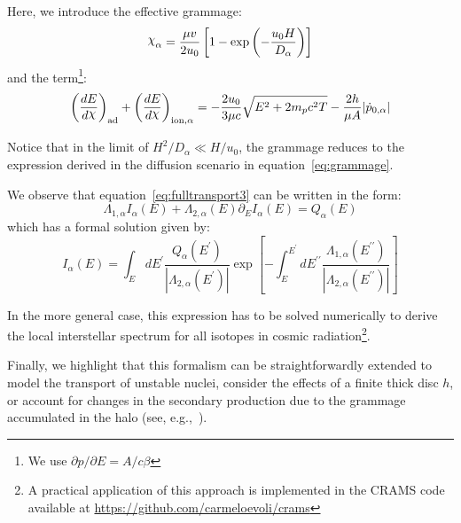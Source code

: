 Here, we introduce the effective grammage:
%
\begin{equation}
\rchi_\alpha = \frac{\mu v}{2 u_0} \left[ 1 - \exp \left(-\frac{u_0 H}{D_\alpha} \right) \right]
\end{equation}
%
and the term\footnote{We use $\partial p/\partial E = A / c \beta$}:
%
\begin{equation}
 \left( \frac{dE}{d\rchi}\right)_{\rm ad} + \left( \frac{dE}{d\rchi} \right)_{\rm ion, \alpha} = 
 -\frac{2 u_0}{3 \mu c} \sqrt{E^2 + 2 m_p c^2 T} - \frac{2 h}{\mu A} |\dot p_{0,\alpha}|
\end{equation}

Notice that in the limit of $H^2 / D_\alpha \ll H / u_0$, the grammage reduces to the expression derived in the diffusion scenario in equation~\ref{eq:grammage}.

We observe that equation~\ref{eq:fulltransport3} can be written in the form:
%
\begin{equation}
\Lambda_{1,\alpha} I_\alpha(E) + \Lambda_{2, \alpha}(E) \partial_E I_\alpha(E) = Q_\alpha(E)
\end{equation}
%
which has a formal solution given by:
%
\begin{equation}
I_\alpha(E) = \int_E dE^\prime \frac{Q_\alpha(E^\prime)}{|\Lambda_{2,\alpha}(E^\prime)|} \exp\left[ -\int_E^{E^\prime} dE^{\prime\prime} \frac{\Lambda_{1,\alpha}(E^{\prime\prime})}{|\Lambda_{2,\alpha}(E^{\prime\prime})|} \right]
\end{equation}

In the more general case, this expression has to be solved numerically to derive the local interstellar spectrum for all isotopes in cosmic radiation\footnote{A practical application of this approach is implemented in the CRAMS code available at \url{https://github.com/carmeloevoli/crams}}.

Finally, we highlight that this formalism can be straightforwardly extended to model the transport of unstable nuclei, consider the effects of a finite thick disc $h$, or account for changes in the secondary production due to the grammage accumulated in the halo (see, e.g.,~\cite{Morlino2020prd,Evoli2020prd}).

